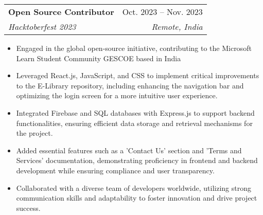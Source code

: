 \documentclass[letterpaper,11pt]{article}
\makeatletter
\newcommand{\resumeItem}[1]{
  \item\small{
    {#1 \vspace{-2pt}}
  }
}
\newcommand{\resumeSubheading}[4]{
  \vspace{-2pt}\item
    \begin{tabular*}{0.97\textwidth}[t]{l@{\extracolsep{\fill}}r}
      \textbf{#1} & #2 \\
      \textit{\small#3} & \textit{\small #4} \\
    \end{tabular*}\vspace{-7pt}
}
\newcommand{\resumeSubSubheading}[2]{
    \item
    \begin{tabular*}{0.97\textwidth}{l@{\extracolsep{\fill}}r}
      \textit{\small#1} & \textit{\small #2} \\
    \end{tabular*}\vspace{-7pt}
}
\newcommand{\resumeSubHeadingListEnd}{\end{itemize}}
\newcommand{\resumeItemListStart}{\begin{itemize}}
\newcommand{\resumeItemListEnd}{\end{itemize}\vspace{-5pt}}
\makeatother
\begin{document}
    \resumeSubheading
      {Open Source Contributor}{Oct. 2023 -- Nov. 2023}
      {Hacktoberfest 2023}{Remote, India}
      \resumeItemListStart
        \resumeItem{Engaged in the global open-source initiative, contributing to the Microsoft Learn Student Community GESCOE based in India}
        \resumeItem{Leveraged React.js, JavaScript, and CSS to implement critical improvements to the E-Library repository, including enhancing the navigation bar and optimizing the login screen for a more intuitive user experience.}
        \resumeItem{Integrated Firebase and SQL databases with Express.js to support backend functionalities, ensuring efficient data storage and retrieval mechanisms for the project.}
        \resumeItem{Added essential features such as a 'Contact Us' section and 'Terms and Services' documentation, demonstrating proficiency in frontend and backend development while ensuring compliance and user transparency.}
        \resumeItem{Collaborated with a diverse team of developers worldwide, utilizing strong communication skills and adaptability to foster innovation and drive project success.}
      \resumeItemListEnd
      


\end{document}
